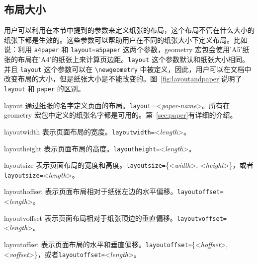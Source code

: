 \documentclass[titlepage]{ctexart}
\def\Gm{\textsf{geometry}}
\newenvironment{Options}%
  {\begin{list}{}{%
   \renewcommand{\makelabel}[1]{\texttt{##1}\hfil}%
   \setlength{\itemsep}{-.5\parsep}
   \settowidth{\labelwidth}{\texttt{xxxxxxxxxxx\space}}%
   \setlength{\leftmargin}{\labelwidth}%
   \addtolength{\leftmargin}{\labelsep}}%
   \raggedright}
  {\end{list}}
\begin{document}
	 \subsection{布局大小}
	 
	 用户可以利用在本节中提到的参数来定义纸张的布局，这个布局不管在什么大小的纸张下都是生效的。这些参数可以帮助用户在不同的纸张大小下定义布局。比如说：利用 \verb|a4paper| 和 \verb|layout=a5paper| 这两个参数，\Gm{} 宏包会使用'A5'纸张的布局在'A4'的纸张上来计算页边距。\verb|layout| 这个参数默认和纸张大小相同。
	 并且 \verb|layout| 这个参数可以在 \verb|\newgeometry| 中被定义，因此，用户可以在文档中改变布局的大小，但是纸张大小是不能改变的。图~\ref{fig:layoutandpaper}说明了 \verb|layout| 和 \verb|paper| 的区别。
	 \begin{Options}
	 \item[layout] 通过纸张的名字定义页面的布局。\verb|layout|=<\emph{paper-name}>。所有在\Gm{} 宏包中定义的纸张名字都是可用的。第~\ref{sec:paper}有详细的介绍。
	 \item[layoutwidth] 表示页面布局的宽度。\verb|layoutwidth=|<\emph{length}>。
	 \item[layoutheight] 表示页面布局的高度。\verb|layoutheight=|<\emph{length}>。
	 \item[layoutsize] 表示页面布局的宽度和高度。\verb|layoutsize=|\{<\emph{width}>, <\emph{height}>\}，或者\verb|layoutsize=|<\emph{length}>。
	 \item[layouthoffset] 表示页面布局相对于纸张左边的水平偏移。\verb|layoutoffset=|<\emph{length}>。
	 \item[layoutvoffset] 表示页面布局相对于纸张顶边的垂直偏移。\verb|layoutvoffset=|<\emph{length}>。
	 \item[layoutoffset] 表示页面布局的水平和垂直偏移。\verb|layoutoffset=|\{<\emph{hoffset}>, <\emph{voffset}>\}，或者\verb|layoutoffset=|<\emph{length}>。
	 \end{Options}
\end{document}
